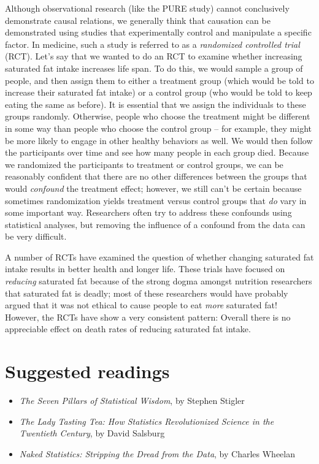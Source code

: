\documentclass[]{book}
\providecommand{\tightlist}{%
  \setlength{\itemsep}{0pt}\setlength{\parskip}{0pt}}
\theoremstyle{definition}
\theoremstyle{definition}
\theoremstyle{definition}
\theoremstyle{remark}
\begin{document}
Although observational research (like the PURE study) cannot
conclusively demonstrate causal relations, we generally think that
causation can be demonstrated using studies that experimentally control
and manipulate a specific factor. In medicine, such a study is referred
to as a \emph{randomized controlled trial} (RCT). Let's say that we
wanted to do an RCT to examine whether increasing saturated fat intake
increases life span. To do this, we would sample a group of people, and
then assign them to either a treatment group (which would be told to
increase their saturated fat intake) or a control group (who would be
told to keep eating the same as before). It is essential that we assign
the individuals to these groups randomly. Otherwise, people who choose
the treatment might be different in some way than people who choose the
control group -- for example, they might be more likely to engage in
other healthy behaviors as well. We would then follow the participants
over time and see how many people in each group died. Because we
randomized the participants to treatment or control groups, we can be
reasonably confident that there are no other differences between the
groups that would \emph{confound} the treatment effect; however, we
still can't be certain because sometimes randomization yields treatment
versus control groups that \emph{do} vary in some important way.
Researchers often try to address these confounds using statistical
analyses, but removing the influence of a confound from the data can be
very difficult.

A number of RCTs have examined the question of whether changing
saturated fat intake results in better health and longer life. These
trials have focused on \emph{reducing} saturated fat because of the
strong dogma amongst nutrition researchers that saturated fat is deadly;
most of these researchers would have probably argued that it was not
ethical to cause people to eat \emph{more} saturated fat! However, the
RCTs have show a very consistent pattern: Overall there is no
appreciable effect on death rates of reducing saturated fat intake.

\section{Suggested readings}\label{suggested-readings}

\begin{itemize}
\tightlist
\item
  \emph{The Seven Pillars of Statistical Wisdom}, by Stephen Stigler
\item
  \emph{The Lady Tasting Tea: How Statistics Revolutionized Science in
  the Twentieth Century}, by David Salsburg
\item
  \emph{Naked Statistics: Stripping the Dread from the Data}, by Charles
  Wheelan
\end{itemize}
\end{document}
